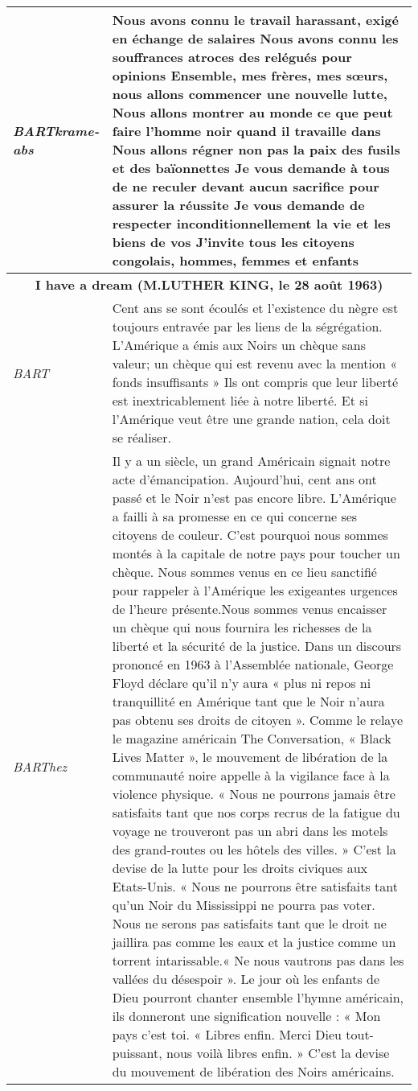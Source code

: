\begin{center}
\begin{longtable}{|p{3cm}|p{13cm}|}
\hline
\textit{BARTkrame-abs} & Nous avons connu le travail harassant, exigé en échange de salaires Nous avons connu les souffrances atroces des relégués pour opinions Ensemble, mes frères, mes sœurs, nous allons commencer une nouvelle lutte, Nous allons montrer au monde ce que peut faire l'homme noir quand il travaille dans Nous allons régner non pas la paix des fusils et des baïonnettes Je vous demande à tous de ne reculer devant aucun sacrifice pour assurer la réussite Je vous demande de respecter inconditionnellement la vie et les biens de vos J’invite tous les citoyens congolais, hommes, femmes et enfants \\
\hline
\hline
\multicolumn{2}{|c|}{{\textbf{I have a dream (M.LUTHER KING, le 28 août 1963)\cite{broquet2008discours100}}}}\\
\hline
\textit{BART} & Cent ans se sont écoulés et l'existence du nègre est toujours entravée par les liens de la ségrégation. L'Amérique a émis aux Noirs un chèque sans valeur; un chèque qui est revenu avec la mention « fonds insuffisants » Ils ont compris que leur liberté est inextricablement liée à notre liberté. Et si l'Amérique veut être une grande nation, cela doit se réaliser. \\
\hline
\textit{BARThez} & Il y a un siècle, un grand Américain signait notre acte d'émancipation. Aujourd'hui, cent ans ont passé et le Noir n'est pas encore libre. L'Amérique a failli à sa promesse en ce qui concerne ses citoyens de couleur. C'est pourquoi nous sommes montés à la capitale de notre pays pour toucher un chèque. Nous sommes venus en ce lieu sanctifié pour rappeler à l'Amérique les exigeantes urgences de l'heure présente.Nous sommes venus encaisser un chèque qui nous fournira les richesses de la liberté et la sécurité de la justice. Dans un discours prononcé en 1963 à l'Assemblée nationale, George Floyd déclare qu'il n'y aura « plus ni repos ni tranquillité en Amérique tant que le Noir n'aura pas obtenu ses droits de citoyen ».
Comme le relaye le magazine américain The Conversation, « Black Lives Matter », le mouvement de libération de la communauté noire appelle à la vigilance face à la violence physique. « Nous ne pourrons jamais être satisfaits tant que nos corps recrus de la fatigue du voyage ne trouveront pas un abri dans les motels des grand-routes ou les hôtels des villes. » C'est la devise de la lutte pour les droits civiques aux Etats-Unis. « Nous ne pourrons être satisfaits tant qu'un Noir du Mississippi ne pourra pas voter. Nous ne serons pas satisfaits tant que le droit ne jaillira pas comme les eaux et la justice comme un torrent intarissable.« Ne nous vautrons pas dans les vallées du désespoir ». Le jour où les enfants de Dieu pourront chanter ensemble l'hymne américain, ils donneront une signification nouvelle : « Mon pays c'est toi. « Libres enfin. Merci Dieu tout-puissant, nous voilà libres enfin. » C'est la devise du mouvement de libération des Noirs américains. \\

\end{longtable}
\end{center}
